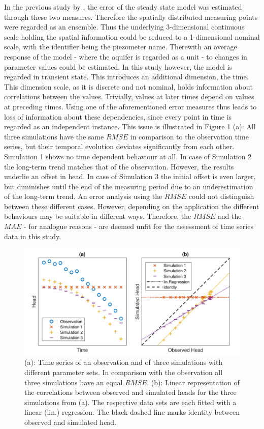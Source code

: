 In the previous study by \textcite{Horn.2021}, the error of the steady state model was estimated through these two measures. 
Therefore the spatially distributed measuring points were regarded as an ensemble. 
Thus the underlying 3-dimensional continuous scale holding the spatial information could be reduced to a 1-dimensional nominal scale, with the identifier being the piezometer name. 
Therewith an average response of the model - where the aquifer is regarded as a unit - to changes in parameter values could be estimated. 
In this study however, the model is regarded in transient state. 
This introduces an additional dimension, the time. 
This dimension scale, as it is discrete and not nominal, holds information about correlations between the values. 
Trivially, values at later times depend on values at preceding times. 
Using one of the aforementioned error measures thus leads to loss of information about these dependencies, since every point in time is regarded as an independent instance. 
This issue is illustrated in Figure \ref{Fig-RMSEvsCorr} (a): All three simulations have the same $RMSE$ in comparison to the observation time series, but their temporal evolution deviates significantly from each other. 
Simulation 1 shows no time dependent behaviour at all. 
In case of Simulation 2 the long-term trend matches that of the observation. 
However, the results underlie an offset in head. 
In case of Simulation 3 the initial offset is even larger, but diminishes until the end of the measuring period due to an underestimation of the long-term trend. 
An error analysis using the $RMSE$ could not distinguish between these different cases. 
However, depending on the application the different behaviours may be suitable in different ways. 
Therefore, the $RMSE$ and the $MAE$ - for analogue reasons - are deemed unfit for the assessment of time series data in this study.

\begin{figure}[h]
    \centering
    \includegraphics{./img/Fig-RMSEvsCorr.pdf}
    \caption{(a): Time series of an observation and of three simulations with different parameter sets. In comparison with the observation all three simulations have an equal $RMSE$. (b): Linear representation of the correlations between observed and simulated heads for the three simulations from (a). The respective data sets are each fitted with a linear (lin.) regression. The black dashed line marks identity between observed and simulated head.}
    \label{Fig-RMSEvsCorr}
\end{figure}

